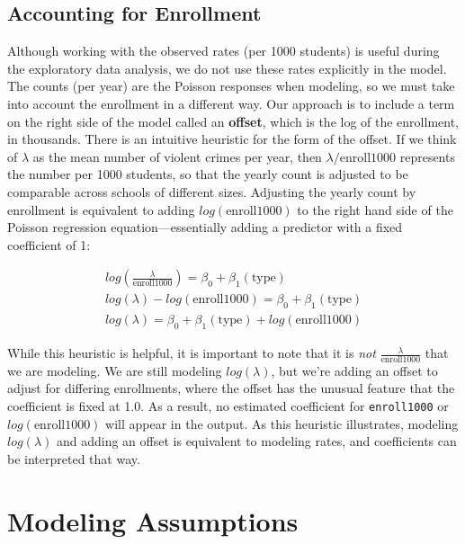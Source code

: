 \documentclass[
]{krantz}
\begin{document}
\hypertarget{accounting-for-enrollment}{%
\subsection{Accounting for Enrollment}\label{accounting-for-enrollment}}

Although working with the observed rates (per 1000 students) is useful during the exploratory data analysis, we do not use these rates explicitly in the model. The counts (per year) are the Poisson responses when modeling, so we must take into account the enrollment in a different way. Our approach is to include a term on the right side of the model called an \textbf{offset},  which is the log of the enrollment, in thousands. There is an intuitive heuristic for the form of the offset. If we think of \(\lambda\) as the mean number of violent crimes per year, then \(\lambda/\textrm{enroll1000}\) represents the number per 1000 students, so that the yearly count is adjusted to be comparable across schools of different sizes. Adjusting the yearly count by enrollment is equivalent to adding \(log(\textrm{enroll1000})\) to the right hand side of the Poisson regression equation---essentially adding a predictor with a fixed coefficient of 1:

\begin{align*} 
log(\frac{\lambda}{\textrm{enroll1000}} )= \beta_0 + \beta_1(\textrm{type}) \nonumber \\
log(\lambda)-log(\textrm{enroll1000}) = \beta_0 + \beta_1(\textrm{type}) \nonumber \\
log(\lambda) = \beta_0 + \beta_1(\textrm{type}) + log(\textrm{enroll1000})
\end{align*}

While this heuristic is helpful, it is important to note that it is \emph{not} \(\frac{\lambda}{ \textrm{enroll1000}}\) that we are modeling. We are still modeling \(log(\lambda)\), but we're adding an offset to adjust for differing enrollments, where the offset has the unusual feature that the coefficient is fixed at 1.0. As a result, no estimated coefficient for \texttt{enroll1000} or \(log(\textrm{enroll1000})\) will appear in the output. As this heuristic illustrates, modeling \(log(\lambda)\) and adding an offset is equivalent to modeling rates, and coefficients can be interpreted that way.

\hypertarget{modeling-assumptions}{%
\section{Modeling Assumptions}\label{modeling-assumptions}}
\end{document}
